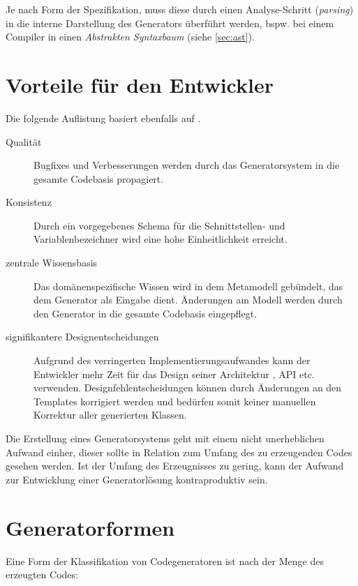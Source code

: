 Je nach Form der Spezifikation, muss diese durch einen Analyse-Schritt (\emph{parsing}) in die interne Darstellung des Generators überführt werden, bspw. bei einem Compiler in einen \emph{Abstrakten Syntaxbaum} (siehe \cref{sec:ast}).

\section{Vorteile für den Entwickler}

Die folgende Auflistung basiert ebenfalls auf \cite[][S. 15]{czarnecki2000generative}.

\begin{description}
    \item[Qualität]
        Bugfixes und Verbesserungen werden durch das Generatorsystem in die gesamte Codebasis propagiert.
    \item[Konsistenz]
        Durch ein vorgegebenes Schema für die Schnittstellen- und Variablenbezeichner wird eine hohe Einheitlichkeit erreicht.
    \item[zentrale Wissensbasis]
        Das domänenspezifische Wissen wird in dem Metamodell gebündelt, das dem Generator als Eingabe dient. Änderungen am Modell werden durch den Generator in die gesamte Codebasis eingepflegt.
    \item[signifikantere Designentscheidungen]
        Aufgrund des verringerten Implementierungsaufwandes kann der Entwickler mehr Zeit für das Design seiner Architektur , API etc. verwenden. Designfehlentscheidungen können durch Änderungen an den Templates korrigiert werden und bedürfen somit keiner manuellen Korrektur aller generierten Klassen.
\end{description}

Die Erstellung eines Generatorsystems geht mit einem nicht unerheblichen Aufwand einher, dieser sollte in Relation zum Umfang des zu erzeugenden Codes gesehen werden.
Ist der Umfang des Erzeugnisses zu gering, kann der Aufwand zur Entwicklung einer Generatorlösung kontraproduktiv sein.

\section{Generatorformen}

Eine Form der Klassifikation von Codegeneratoren ist nach der Menge des erzeugten Codes:

